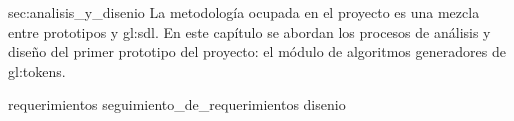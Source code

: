 %
%

  {sec:analisis_y_disenio}{%
  }%
%
La metodología ocupada en el proyecto es una mezcla entre prototipos y
\gls{gl:sdl}. En este capítulo se abordan los procesos de análisis y
diseño del primer prototipo del proyecto: el módulo de algoritmos
generadores de \glspl{gl:token}.

{requerimientos}
{seguimiento_de_requerimientos}
{disenio}
